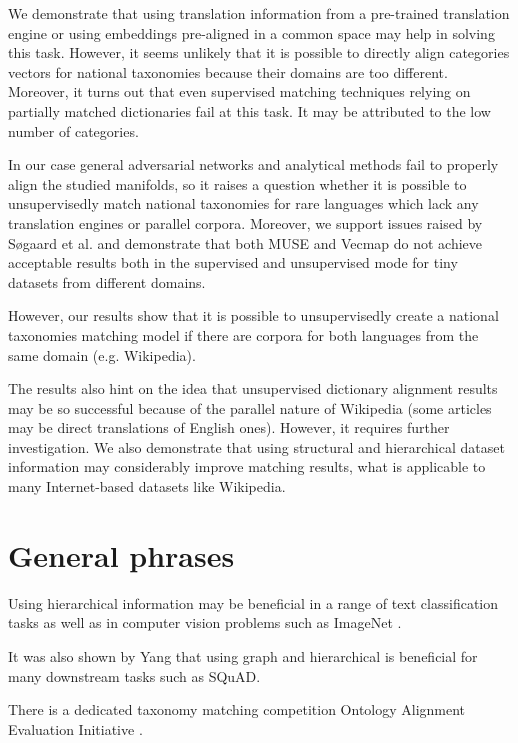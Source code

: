 \documentclass[11pt,a4paper]{article}
\begin{document}
We demonstrate that using translation information from a pre-trained translation engine or using embeddings pre-aligned in a common space may help in solving this task. However, it seems unlikely that it is possible to directly align categories vectors for national taxonomies because their domains are too different. Moreover, it turns out that even supervised matching techniques relying on partially matched dictionaries fail at this task. It may be attributed to the low number of categories.

In our case general adversarial networks and analytical methods fail to properly align the studied manifolds, so it raises a question whether it is possible to unsupervisedly match national taxonomies for rare languages which lack any translation engines or parallel corpora. Moreover, we support issues raised by Søgaard et al. \cite{ruder-muse-limitations} and demonstrate that both MUSE and Vecmap do not achieve acceptable results both in the supervised and unsupervised mode for tiny datasets from different domains.

However, our results show that it is possible to unsupervisedly create a national taxonomies matching model if there are corpora for both languages from the same domain (e.g. Wikipedia).

The results also hint on the idea that unsupervised dictionary alignment results may be so successful because of the parallel nature of Wikipedia (some articles may be direct translations of English ones). However, it requires further investigation.
We also demonstrate that using structural and hierarchical dataset information may considerably improve matching results, what is applicable to many Internet-based datasets like Wikipedia.
\section{General phrases}
Using hierarchical information may be beneficial in a range of text classification tasks \cite{tax2vec} as well as in computer vision problems such as ImageNet \cite{hedging-bets}.

It was also shown by Yang \citeyearpar{glomo} that using graph and hierarchical is beneficial for many downstream tasks such as SQuAD.

There is a dedicated taxonomy matching competition Ontology Alignment Evaluation Initiative \cite{ontology-sota}.




\end{document}
